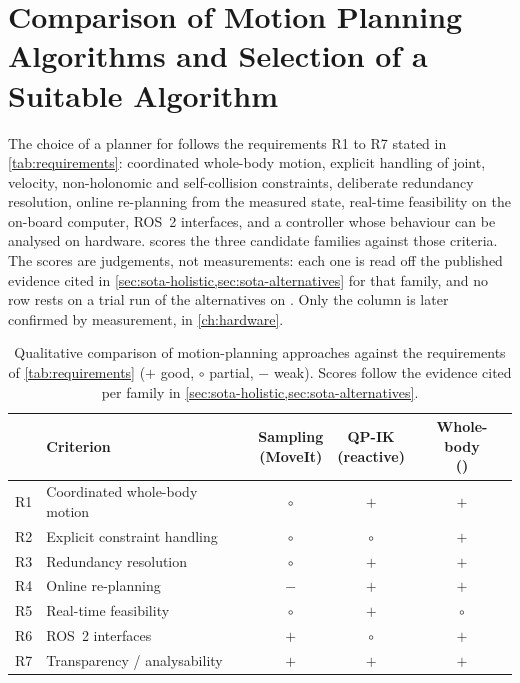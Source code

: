 \section{Comparison of Motion Planning Algorithms and Selection of a
  Suitable Algorithm}
\label{sec:sota-selection}

The choice of a planner for \hero{} follows the requirements R1 to R7
stated in \cref{tab:requirements}: coordinated whole-body motion,
explicit handling of joint, velocity, non-holonomic and self-collision
constraints, deliberate redundancy resolution, online re-planning from
the measured state, real-time feasibility on the on-board computer,
ROS~2 interfaces, and a controller whose behaviour can be analysed on
hardware.  scores the three candidate families
against those criteria. The scores are judgements, not measurements:
each one is read off the published evidence cited in
\cref{sec:sota-holistic,sec:sota-alternatives} for that family, and no
row rests on a trial run of the alternatives on \hero{}. Only the
\ocs{} column is later confirmed by measurement, in
\cref{ch:hardware}.

\begin{table}[htbp]
  \centering
  \caption[Comparison of motion-planning approaches for \hero{}]{%
    Qualitative comparison of motion-planning approaches against the
    requirements of \cref{tab:requirements}
    ($+$ good, $\circ$ partial, $-$ weak). Scores follow the evidence
    cited per family in \cref{sec:sota-holistic,sec:sota-alternatives}.}
  \label{tab:sota-comparison}
  \begin{tabularx}{\linewidth}{@{}llccc@{}}
    \toprule
    & Criterion
      & \shortstack{Sampling\\(MoveIt)}
      & \shortstack{QP-IK\\(reactive)}
      & \shortstack{Whole-body\\\mpc{} (\ocs{})} \\
    \midrule
    R1 & Coordinated whole-body motion & $\circ$ & $+$     & $+$     \\
    R2 & Explicit constraint handling  & $\circ$ & $\circ$ & $+$     \\
    R3 & Redundancy resolution         & $\circ$ & $+$     & $+$     \\
    R4 & Online re-planning            & $-$     & $+$     & $+$     \\
    R5 & Real-time feasibility         & $\circ$ & $+$     & $\circ$ \\
    R6 & ROS~2 interfaces              & $+$     & $\circ$ & $+$     \\
    R7 & Transparency / analysability  & $+$     & $+$     & $+$     \\
    \bottomrule
  \end{tabularx}
\end{table}


